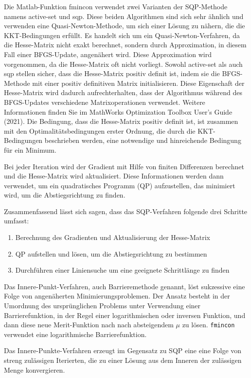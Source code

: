 Die Matlab-Funktion fmincon verwendet zwei Varianten der SQP-Methode namens active-set und sqp. Diese beiden Algorithmen sind sich sehr ähnlich und verwenden eine Quasi-Newton-Methode, um sich einer Lösung zu nähern, die die KKT-Bedingungen erfüllt. Es handelt sich um ein Quasi-Newton-Verfahren, da die Hesse-Matrix nicht exakt berechnet, sondern durch Approximation, in diesem Fall einer BFGS-Update, angenähert wird. Diese Approximation wird vorgenommen, da die Hesse-Matrix oft nicht vorliegt. Sowohl active-set als auch sqp stellen sicher, dass die Hesse-Matrix positiv definit ist, indem sie die BFGS-Methode mit einer positiv definitiven Matrix initialisieren. Diese Eigenschaft der Hesse-Matrix wird dadurch aufrechterhalten, dass der Algorithmus während des BFGS-Updates verschiedene Matrixoperationen verwendet. Weitere Informationen finden Sie im MathWorks Optimization Toolbox User's Guide (2021). Die Bedingung, dass die Hesse-Matrix positiv definit ist, ist zusammen mit den Optimalitätsbedingungen erster Ordnung, die durch die KKT-Bedingungen beschrieben werden, eine notwendige und hinreichende Bedingung für ein Minimum. 

Bei jeder Iteration wird der Gradient mit Hilfe von finiten Differenzen berechnet und die Hesse-Matrix wird aktualisiert. Diese Informationen werden dann verwendet, um ein quadratisches Programm (QP) aufzustellen, das minimiert wird, um die Abstiegsrichtung zu finden.

Zusammenfassend lässt sich sagen, dass das SQP-Verfahren folgende drei Schritte umfasst:
\begin{enumerate}
\item Berechnung des Gradienten und Aktualisierung der Hesse-Matrix
%
\item QP aufstellen und lösen, um die Abstiegsrichtung zu bestimmen
%
\item Durchführen einer Liniensuche um eine geeignete Schrittlänge zu finden
\end{enumerate}

Das Innere-Punkt-Verfahren, auch Barrieremethode genannt, löst sukzessive eine Folge von angenäherten Minimierungsproblemen. Der Ansatz besteht in der Umordnung des ursprünglichen Problems unter Verwendung einer Barrierefunktion, in der Regel einer logarithmischen oder inversen Funktion, und dann diese neue Merit-Funktion nach nach absteigendem $\mu$ zu lösen. \texttt{fmincon} verwendet eine logarithmische Barrierefunktion.

Das Innere-Punkte-Verfahren erzeugt im Gegensatz zu SQP eine eine Folge von streng zulässigen Iterierten, die zu einer Lösung aus dem Inneren der zulässigen Menge konvergieren.

